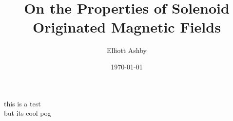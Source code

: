 \documentclass{article}
\title{On the Properties of Solenoid Originated Magnetic Fields}
\author{Elliott Ashby}
\date{\today}
\begin{document}
    this is a test \\ but its cool \newline pog
\end{document}
